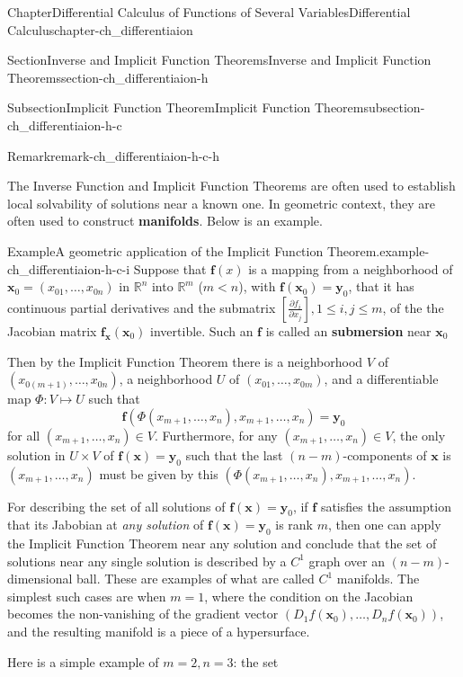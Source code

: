 \documentclass[oneside,10pt,]{book}
\newcommand{\terminology}[1]{\textbf{#1}}
\numberwithin{equation}{section}
\newcommand{\bff}{\mathbf{f}}
\newcommand{\bx}{\mathbf{x}}
\newcommand{\by}{\mathbf{y}}
\newcommand{\lt}{<}
\begin{document}
\begin{chapterptx}{Chapter}{Differential Calculus of Functions of Several Variables}{}{Differential Calculus}{}{}{chapter-ch_differentiaion}
\begin{sectionptx}{Section}{Inverse and Implicit Function Theorems}{}{Inverse and Implicit Function Theorems}{}{}{section-ch_differentiaion-h}
\begin{subsectionptx}{Subsection}{Implicit Function Theorem}{}{Implicit Function Theorem}{}{}{subsection-ch_differentiaion-h-c}
\begin{remark}{Remark}{}{remark-ch_differentiaion-h-c-h}
\par
The Inverse Function and Implicit Function Theorems are often used to establish local solvability of solutions near a known one. In geometric context, they are often used to construct \terminology{manifolds}. Below is an example.%
\end{remark}
\begin{example}{Example}{A geometric application of the Implicit Function Theorem.}{example-ch_differentiaion-h-c-i}%
Suppose that \(\bff(x)\) is a  mapping from a neighborhood of \(\bx_0=(x_{01},\ldots, x_{0n})\) in \(\mathbb R^n \) into \(\mathbb R^m\) (\(m \lt  n\)), with \(\bff(\bx_0)=\by_0\), that it has continuous partial derivatives and the submatrix \([\frac{\partial f_i}{\partial x_j}], 1 \le i, j \le m\), of the the Jacobian matrix  \(\bff_{\bx}(\bx_0)\) invertible. Such an \(\bff\) is called an \terminology{submersion} near \(\bx_0\)%
\par
Then by the Implicit Function Theorem there is a neighborhood \(V\) of \((x_{0 (m+1)},\ldots, x_{0n})\), a neighborhood \(U\) of \((x_{0 1},\ldots, x_{0m})\), and a differentiable map \(\Phi: V\mapsto U\)  such that%
\begin{equation*}
\bff (\Phi(x_{m+1},\ldots, x_{n}), x_{m+1},\ldots, x_{n})=\by_{0}
\end{equation*}
for all \((x_{m+1},\ldots, x_{n})\in V\). Furthermore, for any  \((x_{m+1},\ldots, x_{n})\in V\),  the only solution in \(U\times V\) of \(\bff(\bx)=\by_{0}\) such that the last \((n-m)\)-components of \(\bx\) is \((x_{m+1},\ldots, x_{n})\) must be given by this \((\Phi(x_{m+1},\ldots, x_{n}), x_{m+1},\ldots, x_{n})\).%
\par
For describing the set of all solutions of \({\mathbf f}({\mathbf x})= {\mathbf y}_0 \), if \({\mathbf f}\) satisfies the assumption that its Jabobian at \emph{any solution} of \({\mathbf f}({\mathbf x})= {\mathbf y}_0 \) is rank \(m\), then one can apply the Implicit Function Theorem near any solution and conclude that the set of solutions near any single solution is described by a \(C^1\) graph over an \((n-m)\)-dimensional ball. These are examples of what are called \(C^1\) manifolds. The simplest such cases are when \(m=1\), where the condition on the Jacobian becomes the non-vanishing of the gradient vector \((D_{1}f({\mathbf x}_{0}), \ldots, D_{n}f({\mathbf x}_{0}))\), and the resulting manifold is a piece of a hypersurface.%
\par
Here is a simple example of \(m=2, n=3\): the set%
\begin{equation*}

\end{equation*}
\end{example}
\end{subsectionptx}
\end{sectionptx}
\end{chapterptx}
\end{document}
